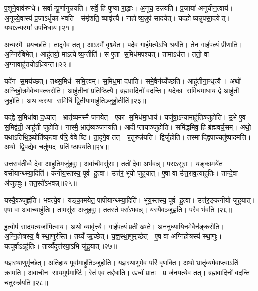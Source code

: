 प॒शूने॒वाव॑रुन्धे। सर्वान्पू॒र्णानुन्न॑यति। सर्वे॒ हि पुण्या॑ रा॒द्धाः। अ॒नूच॒ उन्न॑यति। प्र॒जाया॑ अनूचीन॒त्वाय॑। अ॒नूच्ये॒वास्य॑ प्र॒जाऽर्धु॑का भवति। संमृ॑शति॒ व्यावृ॑त्त्यै। नाहोष्य॒न्नुप॑ सादयेत्। यदहोष्यन्नुपसा॒दयेत्। यथा॒ऽन्यस्मा॑ उपनि॒धाय॑॥२१॥

अ॒न्यस्मै प्र॒यच्छ॑ति। ता॒दृगे॒व तत्। आऽस्मै॑ वृश्च्येत। यदे॒व गार्\mbox{}ह॑पत्येऽधि॒ श्रय॑ति। तेन॒ गार्\mbox{}ह॑पत्यं प्रीणाति। अ॒ग्निर॑बिभेत्। आहु॑तयो॒ माऽत्येष्य॒न्तीति॑। स ए॒ता स॒मिध॑मपश्यत्। तामाऽध॑त्त। ततो॒ वा अ॒ग्नावाहु॑तयोऽध्रियन्त॥२२॥

यदे॑न स॒मय॑च्छत्। तथ्स॒मिध॑ समि॒त्त्वम्। स॒मिध॒मा द॑धाति। समे॒वैन॑य्यँच्छति। आहु॑तीना॒न्धृत्यै। अथो॑ अग्निहो॒त्रमे॒वेध्मव॑त्करोति। आहु॑तीनां॒ प्रति॑ष्ठित्यै। ब्र॒ह्म॒वा॒दिनो॑ वदन्ति। यदेका स॒मिध॑मा॒धाय॒ द्वे आहु॑ती जु॒होति॑। अथ॒ कस्या स॒मिधि॑ द्वि॒तीया॒माहु॑तिञ्जुहो॒तीति॑॥२३॥

यद्द्वे स॒मिधा॑वा द॒ध्यात्। भ्रातृ॑व्यमस्मै जनयेत्। एका स॒मिध॑मा॒धाय॑। यजु॑षा॒ऽन्यामाहु॑तिञ्जुहोति। उ॒भे ए॒व स॒मिद्व॑ती॒ आहु॑ती जुहोति। नास्मै॒ भ्रातृ॑व्यञ्जनयति। आदीप्तायाञ्जुहोति। समि॑द्धमिव॒ हि ब्र॑ह्मवर्च॒सम्। अथो॒ यथाऽति॑थि॒ञ्ज्योति॑ष्कृ॒त्वा प॑रि॒ वेवेष्टि। ता॒दृगे॒व तत्। च॒तुरुन्न॑यति। द्विर्जु॑होति। तस्माद्द्वि॒पाच्चतु॑ष्पादमत्ति। अथो द्वि॒पद्ये॒व चतु॑ष्पद॒ प्रति॑ ष्ठापयति॥२४॥

उ॒त्त॒राव॑तीँ॒व्वै दे॒वा आहु॑ति॒मजु॑हवुः। अवा॑ची॒मसु॑राः। ततो॑ दे॒वा अभ॑वन्न्। पराऽसु॑राः। यङ्का॒मये॑त॒ वसी॑यान्थ्स्या॒दिति॑। कनी॑य॒स्तस्य॒ पूर्व हु॒त्वा। उत्त॑रं॒ भूयो॑ जुहुयात्। ए॒षा वा उ॑त्त॒राव॒त्याहु॑तिः। तान्दे॒वा अ॑जुहवुः। तत॒स्ते॑ऽभवन्न्॥२५॥

यस्यै॒वञ्जुह्व॑ति। भव॑त्ये॒व। यङ्का॒मये॑त॒ पापी॑यान्थ्स्या॒दिति॑। भूय॒स्तस्य॒ पूर्व हु॒त्वा। उत्त॑र॒ङ्कनी॑यो जुहुयात्। ए॒षा वा अवा॒च्याहु॑तिः। तामसु॑रा अजुहवुः। तत॒स्ते परा॑ऽभवन्न्। यस्यै॒वञ्जुह्व॑ति। परै॒व भ॑वति॥२६॥

हु॒त्वोप॑ सादय॒त्यजा॑मित्वाय। अथो॒ व्यावृ॑त्त्यै। गार्\mbox{}ह॑पत्यं॒ प्रतीख्षते। अन॑नुध्यायिनमे॒वैन॑ङ्करोति। अ॒ग्नि॒हो॒त्रस्य॒ वै स्था॒णुर॑स्ति। तय्यँ ऋ॒च्छेत्। य॒ज्ञ॒स्था॒णुमृ॑च्छेत्। ए॒ष वा अ॑ग्निहो॒त्रस्य॑ स्था॒णुः। यत्पूर्वाऽऽहु॑तिः। ताय्यँदुत्त॑रया॒ऽभि जु॑हु॒यात्॥२७॥

य॒ज्ञ॒स्था॒णुमृ॑च्छेत्। अ॒ति॒हाय॒ पूर्वा॒माहु॑तिञ्जुहोति। य॒ज्ञ॒स्था॒णुमे॒व परि॑ वृणक्ति। अथो॒ भ्रातृ॑व्यमे॒वाप्त्वाऽति॑ क्रामति। अ॒वा॒चीन सा॒यमुप॑मार्ष्टि। रेत॑ ए॒व तद्द॑धाति। ऊ॒र्ध्वं प्रा॒तः। प्र ज॑नयत्ये॒व तत्। ब्र॒ह्म॒वा॒दिनो॑ वदन्ति। च॒तुरुन्न॑यति॥२८॥

